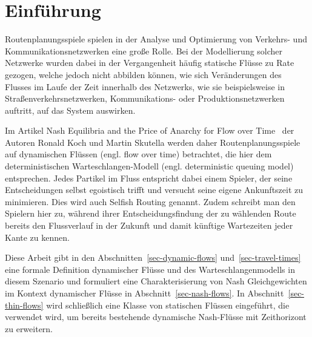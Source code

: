 \section{Einführung}\label{introduction}

Routenplanungsspiele spielen in der Analyse und Optimierung von Verkehrs- und Kommunikationsnetzwerken eine große Rolle.
Bei der Modellierung solcher Netzwerke wurden dabei in der Vergangenheit häufig statische Flüsse zu Rate gezogen, welche jedoch nicht abbilden können, wie sich Veränderungen des Flusses im Laufe der Zeit innerhalb des Netzwerks, wie sie beispielsweise in Straßenverkehrsnetzwerken, Kommunikations- oder Produktionsnetzwerken auftritt, auf das System auswirken.

Im Artikel \glqq Nash Equilibria and the Price of Anarchy for Flow over Time\grqq\ \cite{Koch2011} der Autoren Ronald Koch und Martin Skutella werden daher Routenplanungsspiele auf dynamischen Flüssen (engl. flow over time) betrachtet, die hier dem deterministischen Warte\-schlangen-Modell (engl. deterministic queuing model) entsprechen.
Jedes Partikel im Fluss entspricht dabei einem Spieler, der seine Entscheidungen selbst egoistisch trifft und versucht seine eigene Ankunftszeit zu minimieren.
Dies wird auch Selfish Routing genannt.
Zudem schreibt man den Spielern hier zu, während ihrer Entscheidungsfindung der zu wählenden Route bereits den Flussverlauf in der Zukunft und damit künftige Wartezeiten jeder Kante zu kennen.

Diese Arbeit gibt in den Abschnitten~\ref{sec-dynamic-flows} und~\ref{sec-travel-times} eine formale Definition dynamischer Flüsse und des Warteschlangenmodells in diesem Szenario und formuliert eine Charakterisierung von Nash Gleichgewichten im Kontext dynamischer Flüsse in Abschnitt~\ref{sec-nash-flows}.
In Abschnitt~\ref{sec-thin-flows} wird schließlich eine Klasse von statischen Flüssen eingeführt, die verwendet wird, um bereits bestehende dynamische Nash-Flüsse mit Zeithorizont zu erweitern.